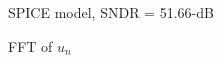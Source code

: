 {\begin{figure}[htbp]
\caption{SPICE model, SNDR = 51.66-dB}
\label{sdrfig:intmod_spice}
\end{figure}

\begin{figure}[htbp]
 \caption{FFT of $u_n$}
\label{sdrfig:intmod_u} 
\end{figure}

}

